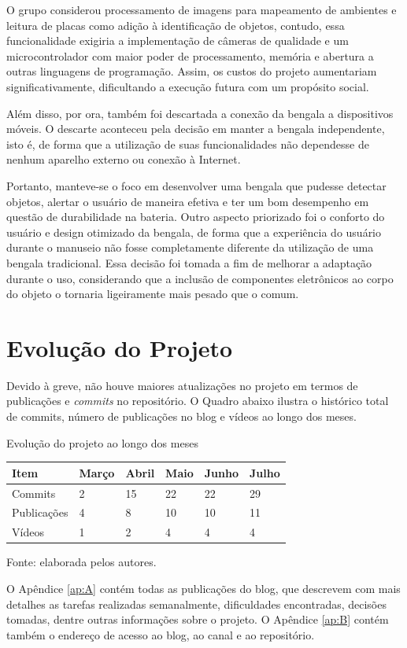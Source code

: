     O grupo considerou processamento de imagens para mapeamento de ambientes e leitura de placas como adição à identificação de objetos, contudo, essa funcionalidade exigiria a implementação de câmeras de qualidade e um microcontrolador com maior poder de processamento, memória e abertura a outras linguagens de programação. Assim, os custos do projeto aumentariam significativamente, dificultando a execução futura com um propósito social.

    Além disso, por ora, também foi descartada a conexão da bengala a dispositivos móveis. O descarte aconteceu pela decisão em manter a bengala independente, isto é, de forma que a utilização de suas funcionalidades não dependesse de nenhum aparelho externo ou conexão à Internet. 

    Portanto, manteve-se o foco em desenvolver uma bengala que pudesse detectar objetos, alertar o usuário de maneira efetiva e ter um bom desempenho em questão de durabilidade na bateria. Outro aspecto priorizado foi o conforto do usuário e design otimizado da bengala, de forma que a experiência do usuário durante o manuseio não fosse completamente diferente da utilização de uma bengala tradicional. Essa decisão foi tomada a fim de melhorar a adaptação durante o uso, considerando que a inclusão de componentes eletrônicos ao corpo do objeto o tornaria ligeiramente mais pesado que o comum.

    \section{Evolução do Projeto}
    Devido à greve, não houve maiores atualizações no projeto em termos de publicações e \textit{commits} no repositório. O Quadro abaixo ilustra o histórico total de commits, número de publicações no blog e vídeos ao longo dos meses. 

    \begin{quadro}[!ht]    
    \captionsetup{width=1.0\textwidth} %
    \caption{Evolução do projeto ao longo dos meses}  
    \renewcommand{\arraystretch}{1.5} 
     \begin{tabular}{p{}p{}p{}p{}p{}p{}}
        \toprule
        Item & Março & Abril & Maio & Junho & Julho \\
        \midrule
        Commits & 2 & 15 & 22 & 22 & 29 \\
        Publicações & 4 & 8 & 10 & 10 & 11 \\
        Vídeos & 1 & 2 & 4 & 4 & 4 \\
        \bottomrule
    \end{tabular}
    \caption*{Fonte: elaborada pelos autores.} %
\end{quadro}

    O Apêndice \ref{ap:A} contém todas as publicações do blog, que descrevem com mais detalhes as tarefas realizadas semanalmente, dificuldades encontradas, decisões tomadas, dentre outras informações sobre o projeto. O Apêndice \ref{ap:B} contém também o endereço de acesso ao blog, ao canal e ao repositório.